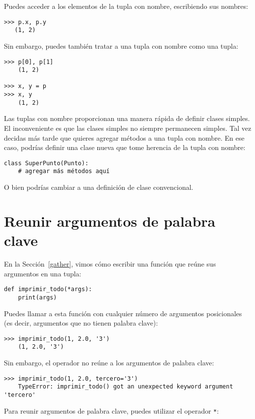 \documentclass[10pt]{book}
\begin{document}
Puedes acceder a los elementos de la tupla con nombre, escribiendo sus nombres:

\begin{verbatim}
>>> p.x, p.y
   (1, 2)
\end{verbatim}

Sin embargo, puedes también tratar a una tupla con nombre como una tupla:

\begin{verbatim}
>>> p[0], p[1]
    (1, 2)

>>> x, y = p
>>> x, y
    (1, 2)
\end{verbatim}

Las tuplas con nombre proporcionan una manera rápida de definir clases simples.
El inconveniente es que las clases simples no siempre permanecen simples.
Tal vez decidas más tarde que quieres agregar métodos a una tupla con nombre.
En ese caso, podrías definir una clase nueva que tome herencia de
la tupla con nombre:

\begin{verbatim}
class SuperPunto(Punto):
    # agregar más métodos aquí
\end{verbatim}

O bien podrías cambiar a una definición de clase convencional.


\section{Reunir argumentos de palabra clave}

En la Sección~\ref{gather}, vimos cómo escribir una función que
reúne sus argumentos en una tupla:

\begin{verbatim}
def imprimir_todo(*args):
    print(args)
\end{verbatim}
%
Puedes llamar a esta función con cualquier número de argumentos posicionales
(es decir, argumentos que no tienen palabra clave):

\begin{verbatim}
>>> imprimir_todo(1, 2.0, '3')
    (1, 2.0, '3')
\end{verbatim}
%
Sin embargo, el operador {\tt *} no reúne a los argumentos de palabra clave:

\begin{verbatim}
>>> imprimir_todo(1, 2.0, tercero='3')
    TypeError: imprimir_todo() got an unexpected keyword argument 'tercero'
\end{verbatim}
%
Para reunir argumentos de palabra clave, puedes utilizar el operador {\tt **}:
\end{document}
